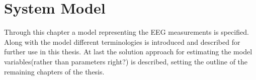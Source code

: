 \chapter{System Model}\label{ch:system_model}
Through this chapter a model representing the EEG measurements is specified. Along with the model different terminologies is introduced and described for further use in this thesis. At last the solution approach for estimating the model variables(rather than parameters right?) is described, setting the outline of the remaining chapters of the thesis. 
    

